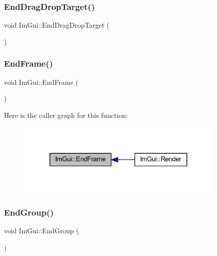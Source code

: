 \subsubsection{\texorpdfstring{End\+Drag\+Drop\+Target()}{EndDragDropTarget()}}
{\footnotesize\ttfamily void Im\+Gui\+::\+End\+Drag\+Drop\+Target (\begin{DoxyParamCaption}{ }\end{DoxyParamCaption})}

\mbox{\label{namespace_im_gui_a246c37da45e88a12ade440a0feacb4ee}} 
\subsubsection{\texorpdfstring{End\+Frame()}{EndFrame()}}
{\footnotesize\ttfamily void Im\+Gui\+::\+End\+Frame (\begin{DoxyParamCaption}{ }\end{DoxyParamCaption})}

Here is the caller graph for this function\+:
\nopagebreak
\begin{figure}[H]
\begin{center}
\leavevmode
\includegraphics[width=288pt]{namespace_im_gui_a246c37da45e88a12ade440a0feacb4ee_icgraph}
\end{center}
\end{figure}
\mbox{\label{namespace_im_gui_a05fc97fc64f28a55486087f503d9a622}} 
\subsubsection{\texorpdfstring{End\+Group()}{EndGroup()}}
{\footnotesize\ttfamily void Im\+Gui\+::\+End\+Group (\begin{DoxyParamCaption}{ }\end{DoxyParamCaption})}

